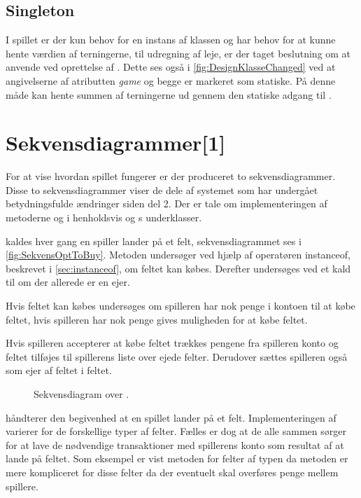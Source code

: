 \subsection{Singleton}\label{sec:desSingleton}
I spillet er der kun behov for en instans af klassen  og  har behov for at kunne hente værdien af terningerne, til udregning af leje, er der taget beslutning om at anvende  ved oprettelse af . Dette ses også i \vref{fig:DesignKlasseChanged} ved at angivelserne af atributten \textit{game} og  begge er markeret som statiske. På denne måde kan  hente summen af terningerne ud gennem den statiske adgang til . 

\section{Sekvensdiagrammer[1]}
For at vise hvordan spillet fungerer er der produceret to sekvensdiagrammer. Disse to sekvensdiagrammer viser de dele af systemet som har undergået betydningsfulde ændringer siden del 2. Der er tale om implementeringen af metoderne  og  i henholdsvis  og s underklasser.

 kaldes hver gang en spiller lander på et felt, sekvensdiagrammet ses i \vref{fig:SekvensOptToBuy}. Metoden undersøger ved hjælp af operatøren instanceof, beskrevet i \vref{sec:instanceof}, om feltet kan købes. Derefter undersøges ved et kald til  om der allerede er en ejer.

Hvis feltet kan købes undersøges om spilleren har nok penge i kontoen til at købe feltet, hvis spilleren har nok penge gives muligheden for at købe  feltet.

Hvis spilleren accepterer at købe feltet trækkes pengene fra spilleren konto og feltet tilføjes til spillerens liste over ejede felter. Derudover sættes spilleren også som ejer af feltet i feltet.

\begin{figure}
\caption{Sekvensdiagram over .}
\label{fig:SekvensOptToBuy}
\centering

\end{figure}

 håndterer den begivenhed at en spillet lander på et felt. Implementeringen af  varierer for de forskellige typer af felter. Fælles er dog at de alle sammen sørger for at lave de nødvendige transaktioner med spillerens konto som resultat af at lande på feltet. Som eksempel er vist metoden for felter af typen  da metoden er mere kompliceret for disse felter da der eventuelt skal overføres penge mellem spillere.

